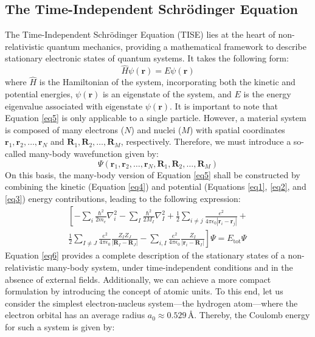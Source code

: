 \subsection{The Time-Independent Schrödinger Equation}
The Time-Independent Schrödinger Equation (TISE) lies at the heart of non-relativistic quantum mechanics, providing a mathematical framework to describe stationary electronic states of quantum systems. It takes the following form:
\begin{equation}
  \label{eq5}
  \hat{H} \psi(\mathbf{r}) = E \psi(\mathbf{r})
\end{equation}
where $\hat{H}$ is the Hamiltonian of the system, incorporating both the kinetic and potential energies, $\psi(\mathbf{r})$ is an eigenstate of the system, and $E$ is the energy eigenvalue associated with eigenstate $\psi(\mathbf{r})$. It is important to note that Equation \ref{eq5} is only applicable to a single particle. However, a material system is composed of many electrons ($N$) and nuclei ($M$) with spatial coordinates $\mathbf{r}_1, \mathbf{r}_2, \ldots, \mathbf{r}_N$ and $\mathbf{R}_1, \mathbf{R}_2, \ldots, \mathbf{R}_M$, respectively. Therefore, we must introduce a so-called many-body wavefunction given by:
\begin{equation}
  \Psi(\mathbf{r}_1, \mathbf{r}_2, \ldots, \mathbf{r}_N, \mathbf{R}_1, \mathbf{R}_2, \ldots, \mathbf{R}_M)
  \label{eq5b}
\end{equation}
On this basis, the many-body version of Equation \ref{eq5} shall be constructed by combining the kinetic (Equation \ref{eq4}) and potential (Equations \ref{eq1}, \ref{eq2}, and \ref{eq3}) energy contributions, leading to the following expression:
\begin{equation}
  \label{eq6}
  \begin{split}
    \left[
      -\sum_i \frac{\hbar^2}{2m_e} \nabla_i^2 
      - \sum_I \frac{\hbar^2}{2M_I} \nabla_I^2 
      + \frac{1}{2} \sum_{i\neq j} \frac{e^2}{4\pi\epsilon_0 |\mathbf{r}_i - \mathbf{r}_j|} +\right. \\
      \left. \frac{1}{2} \sum_{I\neq J} \frac{e^2}{4\pi\epsilon_0} \frac{Z_I Z_J}{|\mathbf{R}_I - \mathbf{R}_J|} 
      - \sum_{i, I} \frac{e^2}{4\pi\epsilon_0} \frac{Z_I}{|\mathbf{r}_i - \mathbf{R}_I|}
    \right]\Psi = E_{\text{tot}} \Psi
  \end{split}
\end{equation}
Equation \ref{eq6} provides a complete description of the stationary states of a non-relativistic many-body system, under time-independent conditions and in the absence of external fields. Additionally, we can achieve a more compact formulation by introducing the concept of atomic units. To this end, let us consider the simplest electron-nucleus system---the hydrogen atom---where the electron orbital has an average radius $a_0 \approx 0.529 \, \text{Å}$. Thereby, the Coulomb energy for such a system is given by:

